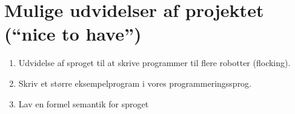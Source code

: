 \documentclass[a4paper,oneside, draft]{memoir}
\begin{document}
\section{Mulige udvidelser af projektet ("`nice to have"')}
\begin{enumerate}

\item Udvidelse af sproget til at skrive programmer til flere robotter (flocking).

\item Skriv et større eksempelprogram i vores programmeringssprog.

\item Lav en formel semantik for sproget

\end{enumerate}









\end{document}
